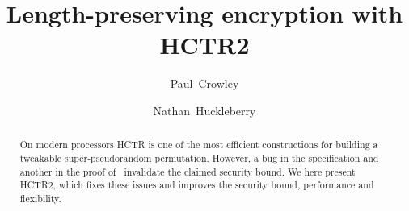 \documentclass[letterpaper,11pt]{article}
\author{Paul~Crowley}
\author{Nathan~Huckleberry}
\affil{Google LLC}
\title{Length-preserving encryption with HCTR2}
\begin{document}
\maketitle

\begin{abstract}
On modern processors HCTR\cite{hctr} is
one of the most efficient constructions
for building a tweakable super-pseudorandom permutation. However,
a bug in the specification and another in the proof of~\cite{hctrquad}
invalidate the claimed security bound. We here present HCTR2,
which fixes these issues and improves the
security bound, performance and flexibility.
\end{abstract}








\printbibliography[heading=bibintoc]
\end{document}
